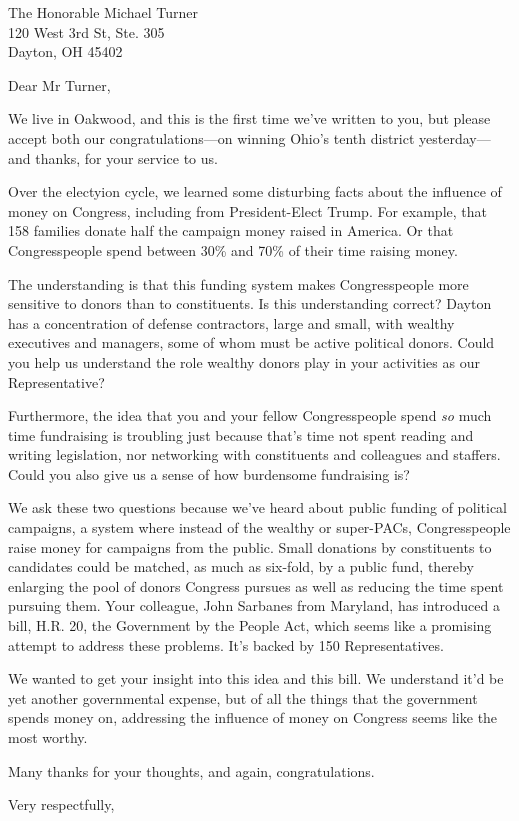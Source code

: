 \documentclass{letter}
\begin{document}
\begin{letter}{
  The Honorable Michael Turner \\
  120 West 3rd St, Ste. 305 \\
  Dayton, OH 45402}

\opening{Dear Mr Turner,}

We live in Oakwood, and this is the first time we've written to you, but please accept both our congratulations---on winning Ohio's tenth district yesterday---and thanks, for your service to us.

Over the electyion cycle, we learned some disturbing facts about the influence of money on Congress, including from President-Elect Trump. For example, that 158 families donate half the campaign money raised in America. Or that Congresspeople spend between 30\% and 70\% of their time raising money.

The understanding is that this funding system makes Congresspeople more sensitive to donors than to constituents. Is this understanding correct? Dayton has a concentration of defense contractors, large and small, with wealthy executives and managers, some of whom must be active political donors. Could you help us understand the role wealthy donors play in your activities as our Representative?

Furthermore, the idea that you and your fellow Congresspeople spend {\em so} much time fundraising is troubling just because that's time not spent reading and writing legislation, nor networking with constituents and colleagues and staffers. Could you also give us a sense of how burdensome fundraising is?

We ask these two questions because we've heard about public funding of political campaigns, a system where instead of the wealthy or super-PACs, Congresspeople raise money for campaigns from the public. Small donations by constituents to candidates could be matched, as much as six-fold, by a public fund, thereby enlarging the pool of donors Congress pursues as well as reducing the time spent pursuing them. Your colleague, John Sarbanes from Maryland, has introduced a bill, H.R. 20, the Government by the People Act, which seems like a promising attempt to address these problems. It's backed by 150 Representatives.

We wanted to get your insight into this idea and this bill. We understand it'd be yet another governmental expense, but of all the things that the government spends money on, addressing the influence of money on Congress seems like the most worthy.

Many thanks for your thoughts, and again, congratulations.

\closing{Very respectfully,}


\end{letter}
\end{document}
